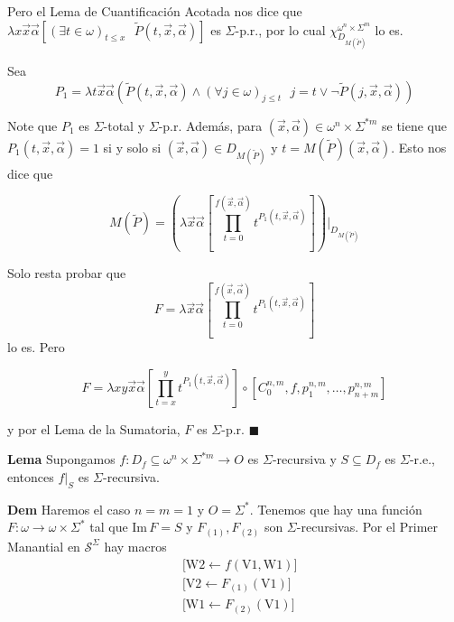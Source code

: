 \documentclass{article}
\begin{document}
Pero el Lema de Cuantificación Acotada nos dice que \( \lambda x \vec{x} \vec{\alpha} \left[ (\exists t \in \omega)_{t \leq x} \text{ } \widetilde{P}(t, \vec{x}, \vec{\alpha}) \right] \) es \( \Sigma \)-p.r., por lo cual \( \chi^{\omega^n \times \Sigma^m}_{D_{M(\widetilde{P})}} \) lo es.

Sea
\[
P_1 = \lambda t \vec{x} \vec{\alpha} \left( \widetilde{P}(t, \vec{x}, \vec{\alpha}) \wedge (\forall j \in \omega)_{j \leq t} \text{ } j = t \vee \neg \widetilde{P}(j, \vec{x}, \vec{\alpha}) \right)
\]

Note que \( P_1 \) es \( \Sigma \)-total y \( \Sigma \)-p.r. Además, para \( (\vec{x}, \vec{\alpha}) \in \omega^n \times \Sigma^{*m} \) se tiene que \( P_1(t, \vec{x}, \vec{\alpha}) = 1 \) si y solo si \( (\vec{x}, \vec{\alpha}) \in D_{M(\widetilde{P})} \) y \( t = M(\widetilde{P})(\vec{x}, \vec{\alpha}) \). Esto nos dice que

\[
M(\widetilde{P}) = \left( \lambda \vec{x} \vec{\alpha} \left[  \prod_{t=0}^{f(\vec{x}, \vec{\alpha})} t^{P_1(t, \vec{x}, \vec{\alpha})} \right] \right) |_{D_{M(\widetilde{P})}}
\]

Solo resta probar que 
\[
F = \lambda \vec{x} \vec{\alpha} \left[  \prod_{t=0}^{f(\vec{x}, \vec{\alpha})} t^{P_1(t, \vec{x}, \vec{\alpha})} \right]
\]
lo es. Pero

\[
F = \lambda x y \vec{x} \vec{\alpha} \left[ \prod_{t=x}^{y} t^{P_1(t,\vec{x},\vec{\alpha})} \right] \circ [C^{n, m}_0, f, p^{n, m}_1, \ldots, p^{n, m}_{n+m}]
\]

y por el Lema de la Sumatoria, \( F \) es \( \Sigma \)-p.r. \hfill $\blacksquare$


\bigskip
\bigskip


\textbf{Lema} Supongamos $f : D_f \subseteq \omega^n \times \Sigma^{*m} \to O$ es $\Sigma$-recursiva y $S \subseteq D_f$ es $\Sigma$-r.e., entonces $f|_S$ es $\Sigma$-recursiva.
\bigskip


\textbf{Dem} Haremos el caso $n = m = 1$ y $O = \Sigma^*$. Tenemos que hay una función $F : \omega \to \omega \times \Sigma^*$ tal que $\text{Im}\, F = S$ y $F_{(1)}, F_{(2)}$ son $\Sigma$-recursivas. Por el Primer Manantial en $\mathcal{S}^\Sigma$ hay macros
\[
\begin{aligned}
&\text{[W2} \leftarrow f(\text{V1}, \text{W1})] \\
&\text{[V2} \leftarrow F_{(1)}(\text{V1})] \\
&\text{[W1} \leftarrow F_{(2)}(\text{V1})]
\end{aligned}
\]
\end{document}
